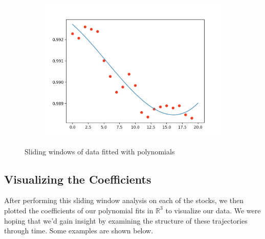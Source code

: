 \documentclass[final]{article}
\begin{document}
\begin{figure}[H]
\begin{subfigure}{.3\textwidth}
  \end{subfigure}
  \begin{subfigure}{.3\textwidth}
    \centering
    \includegraphics[width=\linewidth]{img/sliding3}
  \end{subfigure}
  \caption{Sliding windows of data fitted with polynomials}
  \label{fig:sliding}
\end{figure}

\subsection{Visualizing the Coefficients}
After performing this sliding window analysis on each of the stocks,
we then plotted the coefficients of our polynomial fits in
$\mathbb{R}^3$ to visualize our data. We were hoping that we'd gain
insight by examining the structure of these trajectories through time.
Some examples are shown below.
\end{document}
